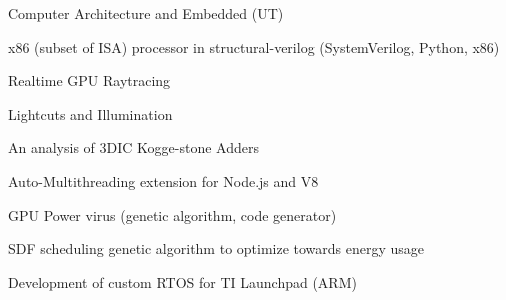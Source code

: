 \boldfont Computer Architecture and Embedded (UT)
\lightfont
\begin{squarelist}
	\item x86 (subset of ISA) processor in structural-verilog (SystemVerilog, Python, x86)
	\item Realtime GPU Raytracing
	\item Lightcuts and Illumination
	\item An analysis of 3DIC Kogge-stone Adders
	\item Auto-Multithreading extension for Node.js and V8
	\item GPU Power virus (genetic algorithm, code generator)
	\item SDF scheduling genetic algorithm to optimize towards energy usage
	\item Development of custom RTOS for TI Launchpad (ARM)
\end{squarelist}
